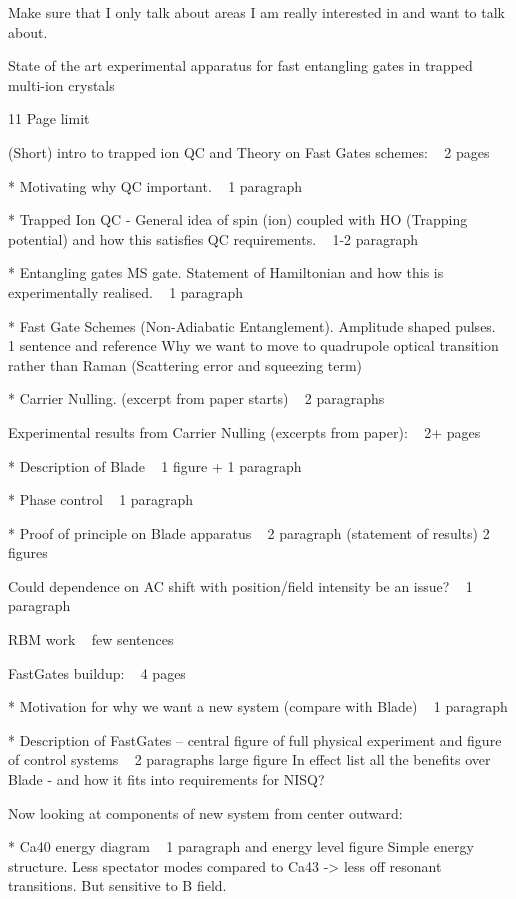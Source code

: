 \documentclass{article}
\begin{document}
Make sure that I only talk about areas I am really interested in and want to talk about. 


State of the art experimental apparatus for fast entangling gates in trapped multi-ion crystals

11 Page limit

(Short) intro to trapped ion QC and Theory on Fast Gates schemes: ~ 2 pages

    * Motivating why QC important. ~ 1 paragraph

    * Trapped Ion QC - General idea of spin (ion) coupled with HO (Trapping potential) and how this satisfies QC requirements. ~ 1-2 paragraph

    * Entangling gates MS gate. Statement of Hamiltonian and how this is experimentally realised. ~ 1 paragraph

    * Fast Gate Schemes (Non-Adiabatic Entanglement). Amplitude shaped pulses. ~ 1 sentence and reference
        Why we want to move to quadrupole optical transition rather than Raman (Scattering error and squeezing term)

    * Carrier Nulling. (excerpt from paper starts) ~ 2 paragraphs

 

Experimental results from Carrier Nulling (excerpts from paper): ~ 2+ pages

    * Description of Blade ~ 1 figure + 1 paragraph

    * Phase control ~ 1 paragraph

    * Proof of principle on Blade apparatus ~ 2 paragraph (statement of results) 2 figures

    Could dependence on AC shift with position/field intensity be an issue? ~ 1 paragraph

    RBM work ~ few sentences

 

FastGates buildup: ~ 4 pages

    * Motivation for why we want a new system (compare with Blade) ~ 1 paragraph

    * Description of FastGates – central figure of full physical experiment and figure of control systems ~ 2 paragraphs large figure
        In effect list all the benefits over Blade - and how it fits into requirements for NISQ?

    Now looking at components of new system from center outward:

    * Ca40 energy diagram  ~ 1 paragraph and energy level figure
        Simple energy structure. Less spectator modes compared to Ca43 -> less off resonant transitions. But sensitive to B field.
\end{document}
